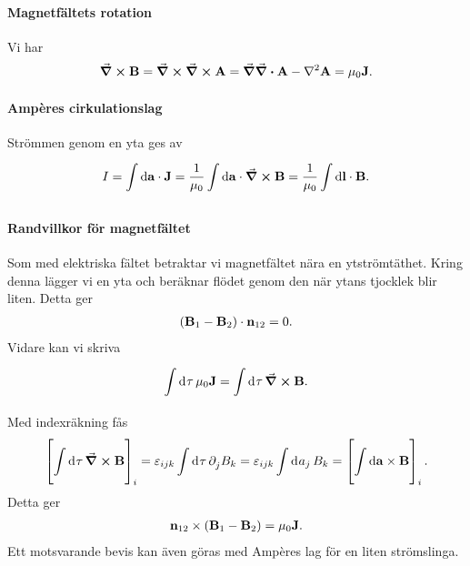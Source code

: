 \paragraph{Magnetfältets rotation}
Vi har
\begin{align*}
	\curl{\vb{B}} = \curl{\curl{\vb{A}}} = \grad{\div{\vb{A}}} - \laplacian{\vb{A}} = \mu_{0}\vb{J}.
\end{align*}

\paragraph{Ampères cirkulationslag}
Strömmen genom en yta ges av
\begin{align*}
	I = \int\limits_{}^{}\dd{\vb{a}}\cdot \vb{J} = \frac{1}{\mu_{0}}\int\limits_{}^{}\dd{\vb{a}}\cdot \curl{\vb{B}} = \frac{1}{\mu_{0}}\int\limits_{}^{}\dd{\vb{l}}\cdot \vb{B}.
\end{align*}

\paragraph{Randvillkor för magnetfältet}
Som med elektriska fältet betraktar vi magnetfältet nära en ytströmtäthet. Kring denna lägger vi en yta och beräknar flödet genom den när ytans tjocklek blir liten. Detta ger
\begin{align*}
	(\vb{B}_{1} - \vb{B}_{2})\cdot\vb{n}_{12} = 0.
\end{align*}
Vidare kan vi skriva
\begin{align*}
	\int\limits_{}^{}\dd[]{\tau}\mu_{0}\vb{J} = \int\limits_{}^{}\dd[]{\tau}\curl{\vb{B}}.
\end{align*}
Med indexräkning fås
\begin{align*}
	\left[\int\limits_{}^{}\dd[]{\tau}\curl{\vb{B}}\right]_{i} = \varepsilon_{ijk}\int\limits_{}^{}\dd[]{\tau}\partial_{j}^{}B_{k} = \varepsilon_{ijk}\int\limits_{}^{}\dd[]{a_{j}}B_{k} = \left[\int\limits_{}^{}\dd{\vb{a}}\times \vb{B}\right]_{i}.
\end{align*}
Detta ger
\begin{align*}
	\vb{n}_{12}\times(\vb{B}_{1} - \vb{B}_{2}) = \mu_{0}\vb{J}.
\end{align*}
Ett motsvarande bevis kan även göras med Ampères lag för en liten strömslinga.